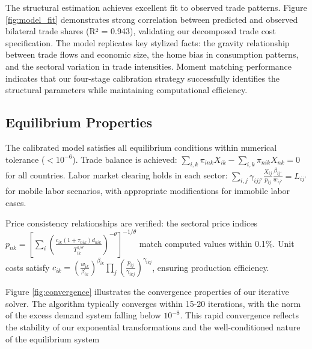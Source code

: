 The structural estimation achieves excellent fit to observed trade patterns. Figure \ref{fig:model_fit} demonstrates strong correlation between predicted and observed bilateral trade shares (R² = 0.943), validating our decomposed trade cost specification. The model replicates key stylized facts: the gravity relationship between trade flows and economic size, the home bias in consumption patterns, and the sectoral variation in trade intensities. Moment matching performance indicates that our four-stage calibration strategy successfully identifies the structural parameters while maintaining computational efficiency.

\subsection{Equilibrium Properties}

The calibrated model satisfies all equilibrium conditions within numerical tolerance ($< 10^{-6}$). Trade balance is achieved: $\sum_{i,k} \pi_{ink} X_{ik} - \sum_{i,k} \pi_{nik} X_{nk} = 0$ for all countries. Labor market clearing holds in each sector: $\sum_{i,j} \gamma_{ijj'} \frac{X_{ij}}{p_{ij}} \frac{\beta_{ij'}}{w_{ij'}} = L_{ij'}$ for mobile labor scenarios, with appropriate modifications for immobile labor cases.

Price consistency relationships are verified: the sectoral price indices $p_{nk} = \left[\sum_{i} \left(\frac{c_{ik}(1+\tau_{nik})d_{nik}}{T_{ik}^{1/\theta}}\right)^{-\theta}\right]^{-1/\theta}$ match computed values within 0.1\%. Unit costs satisfy $c_{ik} = \left(\frac{w_{ik}}{\beta_{ik}}\right)^{\beta_{ik}} \prod_{j} \left(\frac{p_{ij}}{\gamma_{ikj}}\right)^{\gamma_{ikj}}$, ensuring production efficiency.

Figure \ref{fig:convergence} illustrates the convergence properties of our iterative solver. The algorithm typically converges within 15-20 iterations, with the norm of the excess demand system falling below $10^{-8}$. This rapid convergence reflects the stability of our exponential transformations and the well-conditioned nature of the equilibrium system